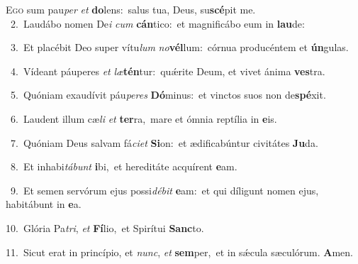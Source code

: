 \lettrine{\initial\textcolor{\initialcolor}{E}}{go} sum pau\textit{per} \textit{et} \textbf{do}\-lens:~\star salus tua, Deus, su\-\textbf{scé}\-pit me.\\
{\numbfont\textcolor{\numbcolor}{~2.}}~Laudábo nomen De\textit{i} \textit{cum} \textbf{cán}\-tico:~\star et magnificábo eum in \textbf{lau}\-de:\par
{\numbfont\textcolor{\numbcolor}{~3.}}~Et placébit Deo super vítu\textit{lum} \textit{no}\-\textbf{vél}lum:~\star córnua producéntem et \textbf{ún}\-gulas.\par
{\numbfont\textcolor{\numbcolor}{~4.}}~Vídeant páuperes \textit{et} \textit{læ}\-\textbf{tén}tur:~\star quǽrite Deum, et vivet ánima \textbf{ves}\-tra.\par
{\numbfont\textcolor{\numbcolor}{~5.}}~Quóniam exaudívit páu\-\textit{pe}\-\textit{res} \textbf{Dó}\-minus:~\star et vinctos suos non de\-\textbf{spé}\-xit.\par
{\numbfont\textcolor{\numbcolor}{~6.}}~Laudent illum cæ\textit{li} \textit{et} \textbf{ter}\-ra,~\star mare et ómnia reptília in \textbf{e}\-is.\par
{\numbfont\textcolor{\numbcolor}{~7.}}~Quóniam Deus salvam fá\-\textit{ci}\-\textit{et} \textbf{Si}\-on:~\star et ædificabúntur civitátes \textbf{Ju}\-da.\par
{\numbfont\textcolor{\numbcolor}{~8.}}~Et inhabi\-\textit{tá}\-\textit{bunt} \textbf{i}\-bi,~\star et hereditáte acquírent \textbf{e}\-am.\par
{\numbfont\textcolor{\numbcolor}{~9.}}~Et semen servórum ejus possi\-\textit{dé}\-\textit{bit} \textbf{e}\-am:~\star et qui díligunt nomen ejus, habitábunt in \textbf{e}\-a.\par
{\numbfont\textcolor{\numbcolor}{10.}}~Glória Pa\-\textit{tri}\-, \textit{et} \textbf{Fí}\-lio,~\star et Spirítui \textbf{Sanc}\-to.\par
{\numbfont\textcolor{\numbcolor}{11.}}~Sicut erat in princípio, et \textit{nunc}\-, \textit{et} \textbf{sem}\-per,~\star et in sǽcula sæculórum. \textbf{A}\-men.\par
